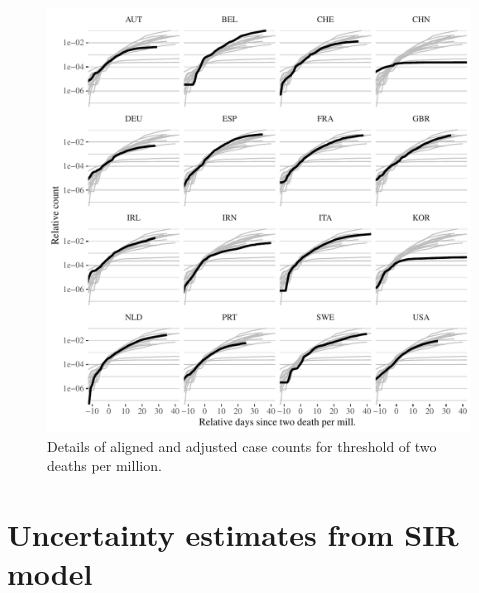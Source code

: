 \documentclass[fullpage,a4paper]{article}
\begin{document}
\begin{figure}
  \includegraphics[width=1\textwidth]{../figs/ecdc_nyt_case_est_twopermill.pdf}
  \caption{\label{fig:align_estcase_nyt} Details of aligned and
    adjusted case counts for threshold of two deaths per million.}
\end{figure}

\section{Uncertainty estimates from SIR model}
\end{document}
